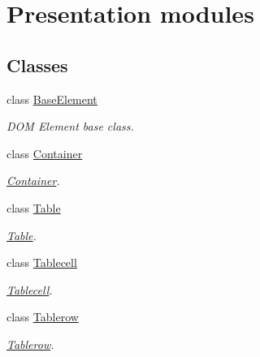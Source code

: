 \section{Presentation modules}
\label{group__OWL__UI__LAYER}
\subsection*{Classes}
\begin{DoxyCompactItemize}
\item 
class \hyperlink{classBaseElement}{BaseElement}
\begin{DoxyCompactList}\small\item\em DOM Element base class. \item\end{DoxyCompactList}\item 
class \hyperlink{classContainer}{Container}
\begin{DoxyCompactList}\small\item\em \hyperlink{classContainer}{Container}. \item\end{DoxyCompactList}\item 
class \hyperlink{classTable}{Table}
\begin{DoxyCompactList}\small\item\em \hyperlink{classTable}{Table}. \item\end{DoxyCompactList}\item 
class \hyperlink{classTablecell}{Tablecell}
\begin{DoxyCompactList}\small\item\em \hyperlink{classTablecell}{Tablecell}. \item\end{DoxyCompactList}\item 
class \hyperlink{classTablerow}{Tablerow}
\begin{DoxyCompactList}\small\item\em \hyperlink{classTablerow}{Tablerow}. \item\end{DoxyCompactList}\end{DoxyCompactItemize}
